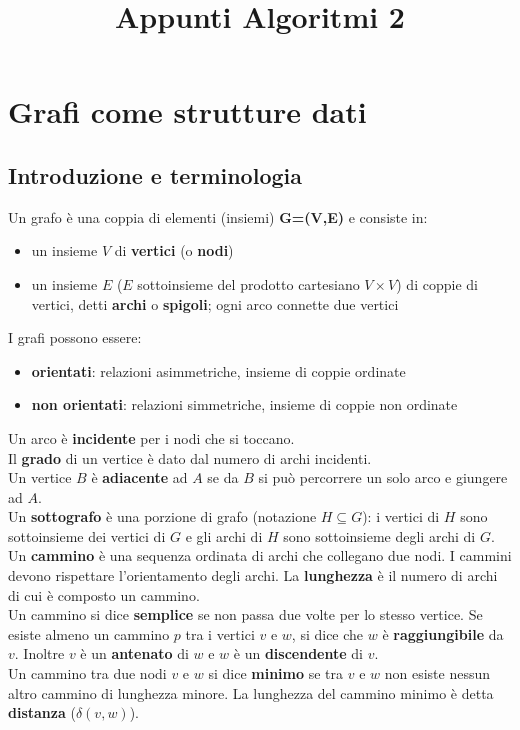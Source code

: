 \documentclass[11pt]{article}
\title{Appunti Algoritmi 2}
\theoremstyle{remark}
\begin{document}
\section{Grafi come strutture dati}
\subsection{Introduzione e terminologia}
Un grafo è una coppia di elementi (insiemi) \textbf{G=(V,E)} e consiste in:
\begin{itemize}
    \item un insieme $V$ di \textbf{vertici} (o \textbf{nodi})
    \item un insieme $E$ ($E$ sottoinsieme del prodotto cartesiano $V\times V$) di coppie di vertici, detti \textbf{archi}
    o \textbf{spigoli}; ogni arco connette due vertici
\end{itemize}
I grafi possono essere:
\begin{itemize}
    \item \textbf{orientati}: relazioni asimmetriche, insieme di coppie ordinate
    \item \textbf{non orientati}: relazioni simmetriche, insieme di coppie non ordinate
\end{itemize}
Un arco è \textbf{incidente} per i nodi che si toccano.\\
Il \textbf{grado} di un vertice è dato dal numero di archi incidenti.\\
Un vertice $B$ è \textbf{adiacente} ad $A$ se da $B$ si può percorrere un solo arco e giungere ad $A$.\\
Un \textbf{sottografo} è una porzione di grafo (notazione $H\subseteq G$): i vertici di $H$ sono sottoinsieme dei vertici di $G$ 
e gli archi di $H$ sono sottoinsieme degli archi di $G$.\\
Un \textbf{cammino} è una sequenza ordinata di archi che collegano due nodi. I cammini devono rispettare l'orientamento 
degli archi. La \textbf{lunghezza} è il numero di archi di cui è composto un cammino.\\ Un cammino si dice \textbf{semplice} 
se non passa due volte per lo stesso vertice. Se esiste almeno un cammino $p$ tra i vertici $v$ e $w$, si dice che $w$ è 
\textbf{raggiungibile} da $v$. Inoltre $v$ è un \textbf{antenato} di $w$ e $w$ è un \textbf{discendente} di $v$.\\ 
Un cammino tra due nodi $v$ e $w$ si dice \textbf{minimo} se tra $v$ e $w$ non esiste nessun altro cammino di lunghezza 
minore. La lunghezza del cammino minimo è detta \textbf{distanza} ($\delta (v,w)$).\\
\end{document}
